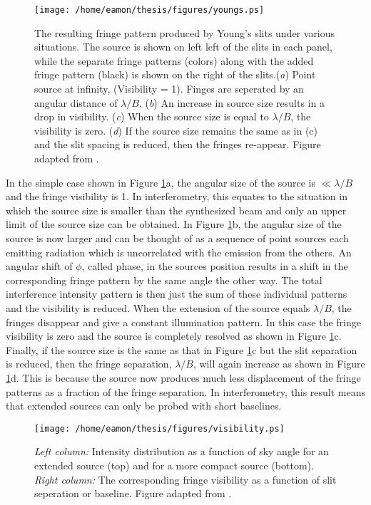 \begin{figure}[hbt!]
\centering 
          \texttt{[image: /home/eamon/thesis/figures/youngs.ps]}
\caption[Fringe pattern produced by Young's slits under various situations.]{The resulting fringe pattern produced by Young's slits under various situations. The source is shown on left left of the slits in each panel, while the separate fringe patterns (colors) along with the added fringe pattern (black) is shown on the right of the slits.(\textit{a}) Point source at infinity, (Visibility = 1). Finges are seperated by an angular distance of $\lambda /B$. (\textit{b}) An increase in source size results in a drop in visibility. (\textit{c}) When the source size is equal to $\lambda /B$, the visibility is zero. (\textit{d}) If the source size remains the same as in (c) and the slit spacing is reduced, then the fringes re-appear. Figure adapted from \cite{jackson_2008}.}
\label{fig2e}
\end{figure}

In the simple case shown in Figure \ref{fig2e}a, the angular size of the source is  $\ll \lambda/B$ and the fringe visibility is 1. In interferometry, this equates to the situation in which the source size is smaller than the synthesized beam and only an upper limit of the source size can be obtained. In Figure \ref{fig2e}b, the angular size of the source is now larger and can be thought of as a sequence of point sources each emitting radiation which is uncorrelated with the emission from the others. An angular shift of $\phi$, called phase, in the sources position results in a shift in the corresponding fringe pattern by the same angle the other way. The total interference intensity pattern is then just the sum of these individual patterns and the visibility is reduced. When the extension of the source equals $\lambda/B$, the fringes disappear and give a constant illumination pattern. In this case the fringe visibility is zero and the source is completely resolved as shown in Figure \ref{fig2e}c. Finally, if the source size is the same as that in Figure \ref{fig2e}c but the slit separation is reduced, then the fringe separation, $\lambda/B$, will again increase as shown in Figure \ref{fig2e}d. This is because the source now produces much less displacement of the fringe patterns as a fraction of the fringe separation. In interferometry, this result means that extended sources can only be probed with short baselines. 

\begin{figure}[hbt!]
\centering 
          \texttt{[image: /home/eamon/thesis/figures/visibility.ps]}
\caption[Visibilities for various source sizes.]{\textit{Left column:} Intensity distribution as a function of sky angle for an extended source (top) and for a more compact source (bottom). \textit{Right column:} The corresponding fringe visibility as a function of slit seperation or baseline. Figure adapted from \cite{jackson_2008}.}
\label{fig2f}
\end{figure}

